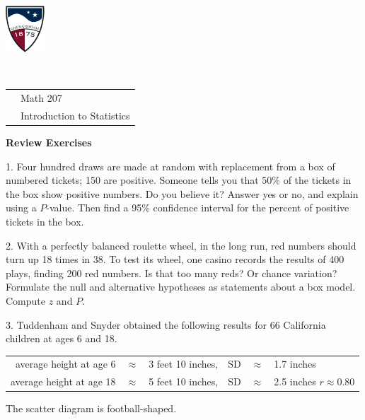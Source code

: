 \documentclass[10pt]{article}
\begin{document}
\pagestyle{empty}
\lstset{language=R, showspaces=false, showstringspaces=false}
\href{http://www.su.edu}{\includegraphics[height=1.75cm]{sulogo.eps}}
\vspace{-1.69cm}

{{\ }\hfill\small
\begin{tabular}{cl}
& Math 207\\
& Introduction to Statistics\\
\end{tabular}
}
\setlength{\baselineskip}{1.05\baselineskip}

\begin{center}
\textbf{\large  Review Exercises}
\end{center}


1. Four hundred draws are made at random with replacement from a box
of numbered tickets;  150 are positive.  Someone tells you that
50\% of the tickets in the box show positive numbers.  Do you believe it?  
Answer yes or no, and explain using a $P$-value.  Then find a 95\% confidence interval
for the percent of positive tickets in the box.
\vspace{1.8in}


2. With a perfectly balanced roulette wheel, in the long run, 
red numbers should turn up 18 times in 38.
To test its wheel, one casino records the results of 400 plays, finding 200 red
numbers.
Is that too many reds?  Or chance variation?
Formulate the null and alternative hypotheses as 
statements about a box model.
Compute $z$ and $P$.
\vspace{1.5in}

3. Tuddenham and Snyder obtained the following results for 66 California children
at ages 6 and 18.  \vspace{-6pt}
\begin{center}
\begin{tabular}{rclrcl}
average height at age 6 & $\approx$ & 3 feet 10 inches, & SD &$\approx$ & 1.7 inches\\
average height at age 18 & $\approx$ & 5 feet 10 inches, & SD &$\approx$ & 2.5 inches
  \hspace{10pt} $r\approx 0.80$\\
\end{tabular}\vspace{-6pt}
\end{center}
The scatter diagram is football-shaped.  
\end{document}
